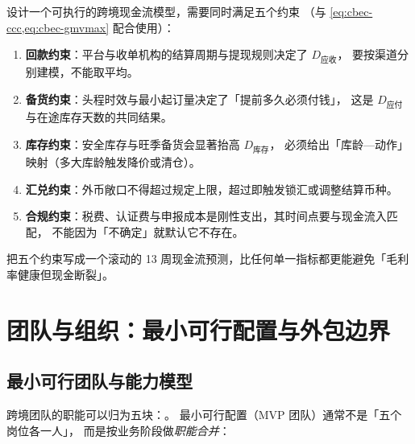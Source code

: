 \begin{keypoint}[现金流模型的五个约束]
设计一个可执行的跨境现金流模型，需要同时满足五个约束
（与 \cref{eq:cbec-ccc,eq:cbec-gmvmax} 配合使用）：
\begin{enumerate}
  \item \textbf{回款约束}：平台与收单机构的结算周期与提现规则决定了 $D_{\text{应收}}$，
        要按渠道分别建模，不能取平均。
  \item \textbf{备货约束}：头程时效与最小起订量决定了「提前多久必须付钱」，
        这是 $D_{\text{应付}}$ 与在途库存天数的共同结果。
  \item \textbf{库存约束}：安全库存与旺季备货会显著抬高 $D_{\text{库存}}$，
        必须给出「库龄—动作」映射（多大库龄触发降价或清仓）。
  \item \textbf{汇兑约束}：外币敞口不得超过规定上限，超过即触发锁汇或调整结算币种。
  \item \textbf{合规约束}：税费、认证费与申报成本是刚性支出，其时间点要与现金流入匹配，
        不能因为「不确定」就默认它不存在。
\end{enumerate}
把五个约束写成一个滚动的 13 周现金流预测，比任何单一指标都更能避免「毛利率健康但现金断裂」。
\end{keypoint}

\section{团队与组织：最小可行配置与外包边界}
\label{sec:cbec-team}

\subsection{最小可行团队与能力模型}

跨境团队的职能可以归为五块：。
最小可行配置（MVP 团队）通常不是「五个岗位各一人」，
而是按业务阶段做\emph{职能合并}：

